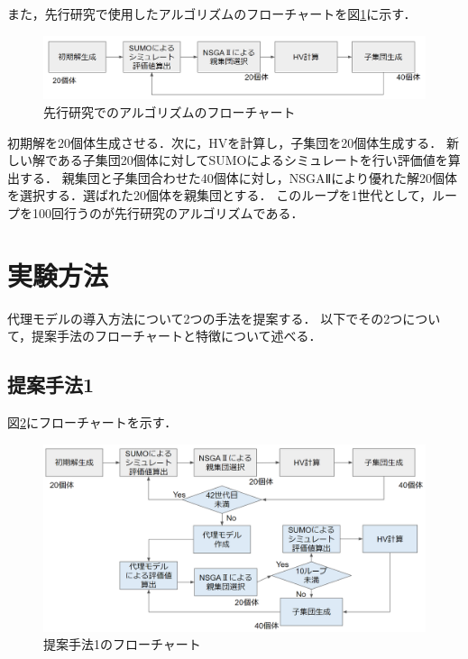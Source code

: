 \documentclass[main]{subfiles}
\begin{document}
    また，先行研究で使用したアルゴリズムのフローチャートを図\ref{old_algo}に示す．
    \begin{figure}
        \centering
        \includegraphics[width=\linewidth]{figures/old_algo.png}
        \caption{先行研究でのアルゴリズムのフローチャート}
        \label{old_algo}
    \end{figure}
    初期解を20個体生成させる．次に，HVを計算し，子集団を20個体生成する．
    新しい解である子集団20個体に対してSUMOによるシミュレートを行い評価値を算出する．
    親集団と子集団合わせた40個体に対し，NSGAⅡにより優れた解20個体を選択する．選ばれた20個体を親集団とする．
    このループを1世代として，ループを100回行うのが先行研究のアルゴリズムである．

    \section{実験方法}
    代理モデルの導入方法について2つの手法を提案する．
    以下でその2つについて，提案手法のフローチャートと特徴について述べる．
        \subsection{提案手法1}
        図\ref{d}にフローチャートを示す．
        \begin{figure}
            \centering
            \includegraphics[width=\linewidth]{figures/d.png}
            \caption{提案手法1のフローチャート}
            \label{d}
        \end{figure}
        
\end{document}
